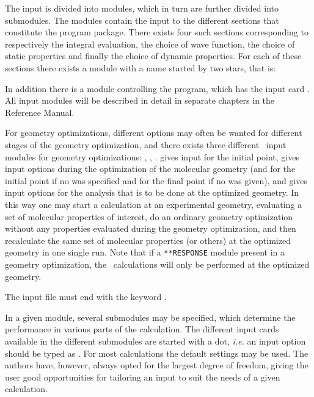 The input is divided into modules, which in turn are
further divided into submodules. The modules contain
the input to the different
sections that constitute the {\dalton} program package. There exists
four such sections corresponding to respectively the integral
evaluation, the choice of wave function, the
choice of static properties and finally
the choice of dynamic properties. For each of
these sections there exists a module with a name started by two stars,
that is:

\begin{list}{}{}
\item {}
\item {}
\item {}
\item {}
\end{list}

In addition there is a module controlling the {\dalton} program, which
has the input card . All
input modules will be described in detail in separate chapters in the
Reference Manual.

For geometry optimizations,
different options may often be wanted for different stages of the
geometry optimization, and there exists three different \aba\ input
modules for geometry optimizations: , ,
.  gives input for the initial point,
 gives input options during the optimization of the
molecular geometry
(and for the initial point if no  was specified and for
the final point if no  was  given),
and  gives input options for the
analysis that is to be done at the optimized geometry. In this way one
may start a calculation at an experimental geometry, evaluating a set
of molecular properties of interest, do an ordinary geometry
optimization without any properties evaluated during the geometry
optimization, and then recalculate the same set of molecular
properties (or others) at the optimized geometry in one single run. 
Note that if a \verb|**RESPONSE| module present in a geometry optimization,
the \resp\ calculations will only be performed at the optimized geometry.

The input file must end with the keyword .

In a given module, several submodules may be
specified, which determine the performance in various parts of the
calculation. The different input cards available
in the different submodules are started with a dot, {\it i.e.\/} an input
option should be typed as . For most calculations the
default settings may be used. The authors have, however, always
opted for the largest degree of freedom, giving the user good
opportunities for tailoring an input to suit the needs of a given
calculation.

